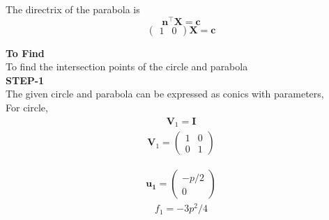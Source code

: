 \documentclass[10pt,a4paper]{report}
\newcommand{\myvec}[1]{\ensuremath{\begin{pmatrix}#1\end{pmatrix}}}
\let\vec\mathbf
\let\vec\mathbf
\begin{document}
\begin{multicols}{2}
\begin{equation}
 \end{equation}
 The directrix of the parabola is\\
 \begin{equation}
	 \vec{n}^{\top}\vec{X}=\vec c
 \end{equation}
\begin{equation}                                    \begin{pmatrix}                                1 & 0 
\end{pmatrix}\vec{X}=\vec c
\end{equation}
 \vspace{2mm}

\textbf{To Find }\vspace{2mm}\\
To find the intersection points of the circle and parabola\vspace{2mm}  \\ 
\textbf{STEP-1}\vspace{2mm}\\
The given circle and parabola can be expressed as conics with parameters,\\ \vspace{1mm}
For circle,\\ \vspace{1mm}
\begin{align}
\vec{V}_1=\vec{I}
\end{align}
\begin{align}
\vec{V}_1=\myvec{
1 & 0\\
0 & 1
}
\end{align} 

\begin{align}
\vec{u_1}=\myvec{-p/2\\
0}
\end{align} 
\begin{align}
f_1=-3p^2/4
\end{align} \vspace{2mm}


\end{multicols}
\end{document}
